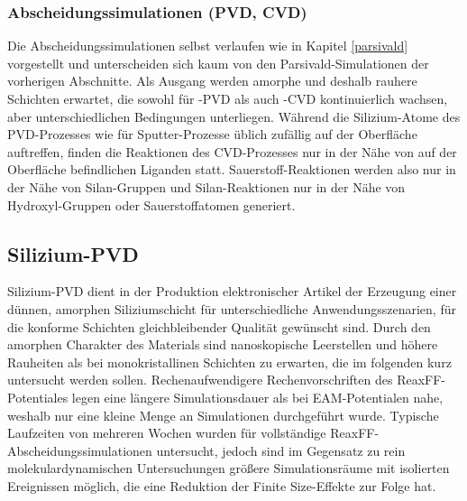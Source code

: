 \subsubsection{Abscheidungssimulationen (PVD, CVD)}

Die Abscheidungssimulationen selbst verlaufen wie in Kapitel \ref{parsivald} vorgestellt und unterscheiden sich kaum von den Parsivald-Simulationen der vorherigen Abschnitte.
Als Ausgang werden amorphe und deshalb rauhere Schichten erwartet, die sowohl für -PVD als auch -CVD kontinuierlich wachsen, aber unterschiedlichen Bedingungen unterliegen.
Während die Silizium-Atome des PVD-Prozesses wie für Sputter-Prozesse üblich zufällig auf der Oberfläche auftreffen, finden die Reaktionen des CVD-Prozesses nur in der Nähe von auf der Oberfläche befindlichen Liganden statt.
Sauerstoff-Reaktionen werden also nur in der Nähe von Silan-Gruppen und Silan-Reaktionen nur in der Nähe von Hydroxyl-Gruppen oder Sauerstoffatomen generiert.

\subsection{Silizium-PVD}

Silizium-PVD dient in der Produktion elektronischer Artikel der Erzeugung einer dünnen, amorphen Siliziumschicht für unterschiedliche Anwendungsszenarien, für die konforme Schichten gleichbleibender Qualität gewünscht sind.
Durch den amorphen Charakter des Materials sind nanoskopische Leerstellen und höhere Rauheiten als bei monokristallinen Schichten zu erwarten, die im folgenden kurz untersucht werden sollen.
Rechenaufwendigere Rechenvorschriften des ReaxFF-Potentiales legen eine längere Simulationsdauer als bei EAM-Potentialen nahe, weshalb nur eine kleine Menge an Simulationen durchgeführt wurde.
Typische Laufzeiten von mehreren Wochen wurden für vollständige ReaxFF-Abscheidungssimulationen untersucht, jedoch sind im Gegensatz zu rein molekulardynamischen Untersuchungen größere Simulationsräume mit isolierten Ereignissen möglich, die eine Reduktion der Finite Size-Effekte zur Folge hat.

